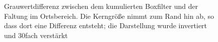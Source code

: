 \documentclass[a4paper,12pt]{article}
\begin{document}





\begin{figure}[htbp]
\caption{Grauwertdifferenz zwischen dem kumulierten Boxfilter und der Faltung im
Ortsbereich. Die Kerngröße nimmt zum Rand hin ab, so dass dort eine Differenz
entsteht; die Darstellung wurde invertiert und 30fach verstärkt}%
\label{figure_hist_kumuBox}
\end{figure}
\end{document}
